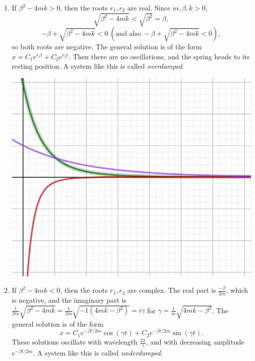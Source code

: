 \documentclass[12pt]{amsart}
\numberwithin{equation}{section}
\theoremstyle{plain} %
\theoremstyle{definition}
\theoremstyle{remark}
\begin{document}
\begin{enumerate}
\item If $\beta^2- 4 m k>0$, then the roots $r_1,r_2$ are real. Since $m,\beta,k>0$, \[\sqrt{\beta^2- 4 m k } < \sqrt{\beta^2}=\beta,\]
\[ -\beta + \sqrt{\beta^2- 4 m k }<0 \ (\text{and also} \  -\beta + \sqrt{\beta^2- 4 m k }<0),\]
so both roots are negative. The general solution is of the form $x = C_1 e^{r_1t} + C_2 e^{r_2 t}$. Then there are no oscillations, and the spring heads to its resting position. A system like this is called \emph{overdamped}.

\begin{center}\includegraphics[scale=.5]{spring1}\end{center}

\item If $\beta^2- 4 m k<0$, then the roots $r_1,r_2$ are complex. The real part is $\frac{-\beta}{2m}$, which is negative, and the imaginary part is $\frac{1}{2m}\sqrt{\beta^2- 4 m k } = \frac{1}{2m}\sqrt{-1 (4 m k - \beta^2) } = i \gamma$ for $\gamma=\frac{1}{m}\sqrt{4 m k - \beta^2}$. The general solution is of the form \[x= C_1 e^{-\beta t / 2m } \cos(\gamma t) + C_2 e^{-\beta t / 2m } \sin(\gamma t).\] These solutions oscillate with wavelength $\frac{2\pi}{\gamma}$, and with decreasing amplitude $e^{-\beta t / 2m }$. A system like this is called \emph{underdamped}.


\end{enumerate}
\end{document}
